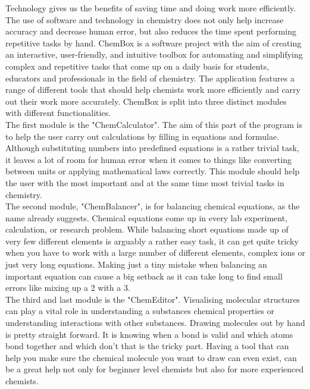 \documentclass[a4paper,12pt]{article}
\begin{document}
Technology gives us the benefits of saving time and doing work more efficiently. The use of software and technology in chemistry does not only help increase accuracy and decrease human error, but also reduces the time spent performing repetitive tasks by hand. ChemBox is a software project with the aim of creating an interactive, user-friendly, and intuitive toolbox for automating and simplifying complex and repetitive tasks that come up on a daily basis for students, educators and professionals in the field of chemistry. The application features a range of different tools that should help chemists work more efficiently and carry out their work more accurately. ChemBox is split into three distinct modules with different functionalities.\\
\linebreak
The first module is the "ChemCalculator". The aim of this part of the program is to help the user carry out calculations by filling in equations and formulae. Although substituting numbers into predefined equations is a rather trivial task, it leaves a lot of room for human error when it comes to things like converting between units or applying mathematical laws correctly. This module should help the user with the most important and at the same time most trivial tasks in chemistry.\\
\linebreak
The second module, "ChemBalancer", is for balancing chemical equations, as the name already suggests. Chemical equations come up in every lab experiment, calculation, or research problem. While balancing short equations made up of very few different elements is arguably a rather easy task, it can get quite tricky when you have to work with a large number of different elements, complex ions or just very long equations. Making just a tiny mistake when balancing an important equation can cause a big setback as it can take long to find small errors like mixing up a 2 with a 3.\\
\linebreak
The third and last module is the "ChemEditor". Visualising molecular structures can play a vital role in understanding a substances chemical properties or understanding interactions with other substances. Drawing molecules out by hand is pretty straight forward. It is knowing when a bond is valid and which atoms bond together and which don't that is the tricky part. Having a tool that can help you make sure the chemical molecule you want to draw can even exist, can be a great help not only for beginner level chemists but also for more experienced chemists.
\end{document}
